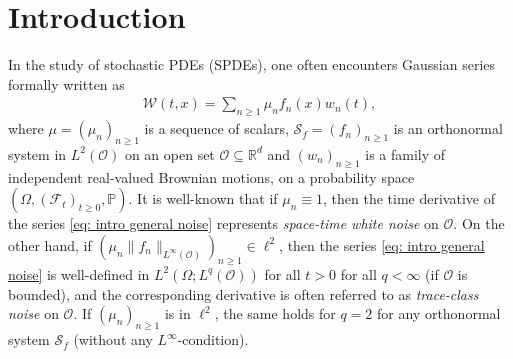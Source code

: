 \documentclass[reqno]{amsart}
\theoremstyle{plain}
\theoremstyle{remark}
\theoremstyle{plain}
\numberwithin{equation}{section}
\newcommand\bR{\mathbb{R}}
\newcommand\bP{\mathbb{P}}
\newcommand\cF{\mathscr{F}}
\newcommand\cO{\mathcal{O}}
\newcommand\cW{\mathcal{W}}
\newcommand{\Domm}{\mathcal{O}}
\newcommand{\1}{\one}
\newcommand{\Sf}{\mathcal{S}_{f}}
\begin{document}
\begin{abstract}
In the study of stochastic PDEs with colored, non-trace class space-time noise, one frequently encounters Gaussian series of the form
$$
\textstyle{g \,
\sum_{n\geq 1} \gamma_n \mu_n f_n,}
$$ 
where $(\gamma_n)_{n}$ is a sequence of independent standard Gaussian variables, $g$ is an $L^\eta(\mathcal{O})$ function, $(\mu_n)_{n}$ is a sequence of scalars, and $(f_n)_n$ is an orthonormal system in $L^2(\mathcal{O})$ where $\mathcal{O} \subseteq \mathbb{R}^d$ is an open set.  
In this manuscript, we establish necessary and sufficient conditions for the above sum to converge in Bessel potential spaces $H^{-s,q}(\mathcal{O})$. The latter can be interpreted as a Sobolev embedding for Gaussian series. 
Our main theorem is formulated using weighted sequence spaces that encode the $L^\infty$-growth of the orthonormal system $(f_n)_{n}$, a feature that is crucial for obtaining sharp estimates. 
We apply our results to the stochastic heat equation with additive non-trace class noise. In this case, our conditions capture the scaling relationship between the heat operator and the coloring of the noise. 
\end{abstract}

\maketitle

\tableofcontents


\section{Introduction}
\label{s:introduction}
In the study of stochastic PDEs (SPDEs), one often encounters Gaussian series formally written as
\begin{align}
\label{eq: intro general noise}
    \cW (t,x) = \sum_{n\geq 1} \mu_nf_n(x) w_n(t),
\end{align}
where $\mu = (\mu_n)_{n\geq 1}$ is a sequence of scalars, $\Sf = (f_n)_{n\geq 1}$ is an orthonormal system in $L^2(\cO)$ on an open set $\cO\subseteq\bR^d$ and $(w_n)_{n\geq 1}$ is a family of independent real-valued Brownian motions,  on a probability space $(\Omega,(\cF_t)_{t\geq 0},\bP)$. It is well-known that if $\mu_n\equiv 1$, then the time derivative of the series \eqref{eq: intro general noise} represents \emph{space-time white noise} on $\cO$. On the other hand, if $(\mu_n\|f_n\|_{L^\infty(\Domm)})_{n\geq 1}\in \ell^2$, then the series \eqref{eq: intro general noise} is well-defined in $L^2(\Omega;L^q(\cO))$ for all $t>0$ for all $q<\infty$ (if $\cO$ is bounded), and the corresponding derivative is often referred to as \emph{trace-class noise} on $\cO$. If $(\mu_n)_{n\geq 1}$ is in $\ell^2$, the same holds for $q=2$ for any orthonormal system $\Sf$ (without any $L^\infty$-condition). 
\end{document}
